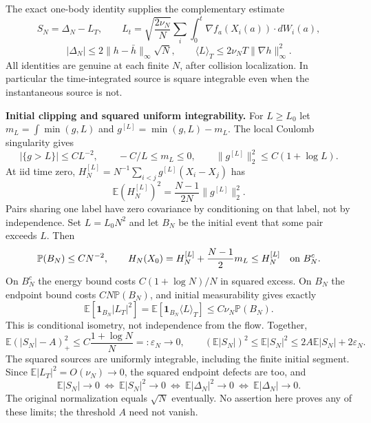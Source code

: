 \documentclass[11pt]{article}
\newcommand{\E}{\mathbb E}
\begin{document}
The exact one-body identity supplies the complementary estimate
\[
 S_N=\Delta_N-L_T,\qquad
 L_t=\sqrt{\frac{2\nu_N}{N}}\sum_i\int_0^t\nabla f_a(X_i(a))\cdot dW_i(a),
\]
\[
 |\Delta_N|\le2\|h-\bar h\|_\infty\sqrt N,\qquad
 \langle L\rangle_T\le2\nu_N T\|\nabla h\|_\infty^2.
\]
All identities are genuine at each finite $N$, after collision localization. In particular the time-integrated source is square integrable even when the instantaneous source is not.

\newpage
\noindent\textbf{Initial clipping and squared uniform integrability.}
For $L\ge L_0$ let $m_L=\int\min(g,L)$ and $g^{[L]}=\min(g,L)-m_L$. The local Coulomb singularity gives
\[
 |\{g>L\}|\le CL^{-2},\qquad -C/L\le m_L\le0,\qquad
 \|g^{[L]}\|_2^2\le C(1+\log L).
\]
At iid time zero, $H_N^{[L]}=N^{-1}\sum_{i<j}g^{[L]}(X_i-X_j)$ has
\[
 \E(H_N^{[L]})^2=\frac{N-1}{2N}\|g^{[L]}\|_2^2.
\]
Pairs sharing one label have zero covariance by conditioning on that label, not by independence. Set $L=L_0N^2$ and let $B_N$ be the initial event that some pair exceeds $L$. Then
\[
 \mathbb P(B_N)\le CN^{-2},\qquad
 H_N(X_0)=H_N^{[L]}+\frac{N-1}{2}m_L\le H_N^{[L]}
 \quad\hbox{on }B_N^c.
\]
On $B_N^c$ the energy bound costs $C(1+\log N)/N$ in squared excess. On $B_N$ the endpoint bound costs $CN\mathbb P(B_N)$, and initial measurability gives exactly
\[
 \E[\mathbf1_{B_N}|L_T|^2]=\E[\mathbf1_{B_N}\langle L\rangle_T]
 \le C\nu_N\mathbb P(B_N).
\]
This is conditional isometry, not independence from the flow. Together,
\[
 \E(|S_N|-A)_+^2\le C\frac{1+\log N}{N}=:\varepsilon_N\to0,
 \qquad
 (\E|S_N|)^2\le\E|S_N|^2\le2A\E|S_N|+2\varepsilon_N.
\]
The squared sources are uniformly integrable, including the finite initial segment. Since $\E|L_T|^2=O(\nu_N)\to0$, the squared endpoint defects are too, and
\[
 \E|S_N|\to0\ \Longleftrightarrow\ \E|S_N|^2\to0
 \ \Longleftrightarrow\ \E|\Delta_N|^2\to0
 \ \Longleftrightarrow\ \E|\Delta_N|\to0.
\]
The original normalization equals $\sqrt N$ eventually. No assertion here proves any of these limits; the threshold $A$ need not vanish.
\end{document}
